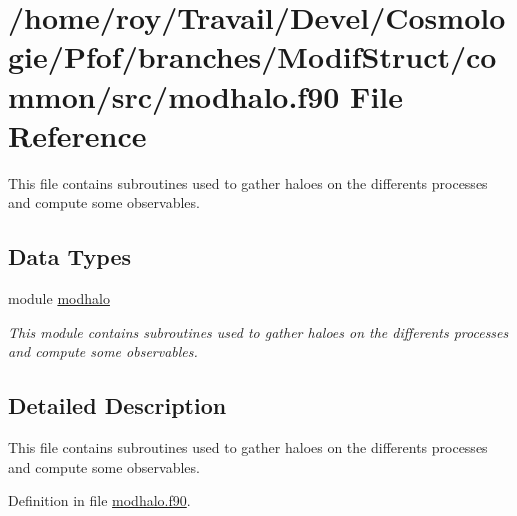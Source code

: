 \hypertarget{modhalo_8f90}{\section{/home/roy/\-Travail/\-Devel/\-Cosmologie/\-Pfof/branches/\-Modif\-Struct/common/src/modhalo.f90 File Reference}
\label{modhalo_8f90}
}


This file contains subroutines used to gather haloes on the differents processes and compute some observables.  


\subsection*{Data Types}
\begin{DoxyCompactItemize}
\item 
module \hyperlink{classmodhalo}{modhalo}
\begin{DoxyCompactList}\small\item\em This module contains subroutines used to gather haloes on the differents processes and compute some observables. \end{DoxyCompactList}\end{DoxyCompactItemize}


\subsection{Detailed Description}
This file contains subroutines used to gather haloes on the differents processes and compute some observables. 

Definition in file \hyperlink{modhalo_8f90_source}{modhalo.\-f90}.

